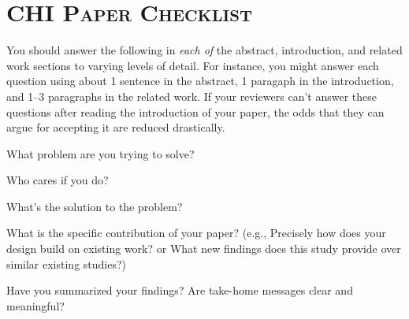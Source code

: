 

\newenvironment{checklist}{%
  \begin{list}{}{}%
  \let\olditem\item
  \renewcommand\item{\olditem[$\Box$] }
}{%
  \end{list}
}

\appendix
\section{\textsc{CHI Paper Checklist}}
\label{sec:checklist}

\noindent\makebox[\linewidth]{\rule{\linewidth}{0.4pt}}

You should answer the following in \emph{each of} the abstract, introduction, and related work sections to varying levels of detail. For instance, you might answer each question using about 1 sentence in the abstract, 1 paragaph in the introduction, and 1--3 paragraphs in the related work. If your reviewers can't answer these questions after reading the introduction of your paper, the odds that they can argue for accepting it are reduced drastically. 

\begin{checklist}
    \item What problem are you trying to solve?
    \item Who cares if you do? 
    \item What's the solution to the problem? 
	\item What is the specific contribution of your paper? (e.g., Precisely how does your design build on existing work? or What new findings does this study provide over similar existing studies?)
	\item Have you summarized your findings? Are take-home messages clear and meaningful? 
\end{checklist}


